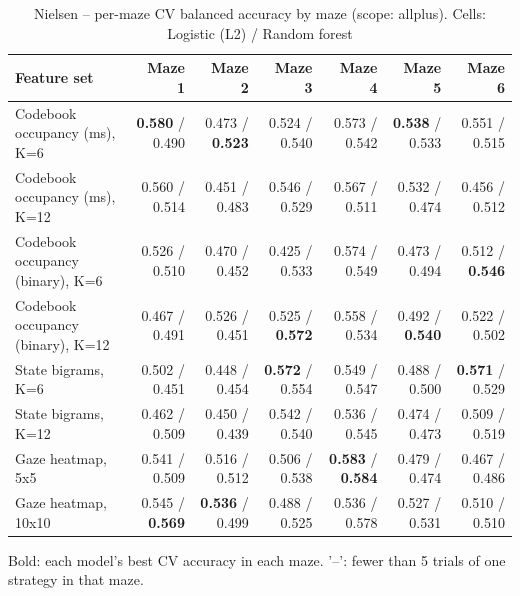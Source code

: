 \begin{table}[t]
\centering
\caption{Nielsen -- per-maze CV balanced accuracy by maze (scope: allplus). Cells: Logistic (L2) / Random forest}
\label{tab:permaze_by_maze_Nielsen}
\begin{tabular}{lrrrrrr}
\toprule
Feature set & Maze 1 & Maze 2 & Maze 3 & Maze 4 & Maze 5 & Maze 6 \\
\midrule
Codebook occupancy (ms), K=6 & \textbf{0.580} / 0.490 & 0.473 / \textbf{0.523} & 0.524 / 0.540 & 0.573 / 0.542 & \textbf{0.538} / 0.533 & 0.551 / 0.515 \\
Codebook occupancy (ms), K=12 & 0.560 / 0.514 & 0.451 / 0.483 & 0.546 / 0.529 & 0.567 / 0.511 & 0.532 / 0.474 & 0.456 / 0.512 \\
Codebook occupancy (binary), K=6 & 0.526 / 0.510 & 0.470 / 0.452 & 0.425 / 0.533 & 0.574 / 0.549 & 0.473 / 0.494 & 0.512 / \textbf{0.546} \\
Codebook occupancy (binary), K=12 & 0.467 / 0.491 & 0.526 / 0.451 & 0.525 / \textbf{0.572} & 0.558 / 0.534 & 0.492 / \textbf{0.540} & 0.522 / 0.502 \\
State bigrams, K=6 & 0.502 / 0.451 & 0.448 / 0.454 & \textbf{0.572} / 0.554 & 0.549 / 0.547 & 0.488 / 0.500 & \textbf{0.571} / 0.529 \\
State bigrams, K=12 & 0.462 / 0.509 & 0.450 / 0.439 & 0.542 / 0.540 & 0.536 / 0.545 & 0.474 / 0.473 & 0.509 / 0.519 \\
Gaze heatmap, 5x5 & 0.541 / 0.509 & 0.516 / 0.512 & 0.506 / 0.538 & \textbf{0.583} / \textbf{0.584} & 0.479 / 0.474 & 0.467 / 0.486 \\
Gaze heatmap, 10x10 & 0.545 / \textbf{0.569} & \textbf{0.536} / 0.499 & 0.488 / 0.525 & 0.536 / 0.578 & 0.527 / 0.531 & 0.510 / 0.510 \\
\bottomrule
\end{tabular}
\par\smallskip
{\footnotesize Bold: each model's best CV accuracy in each maze. '--': fewer than 5 trials of one strategy in that maze.}
\end{table}
